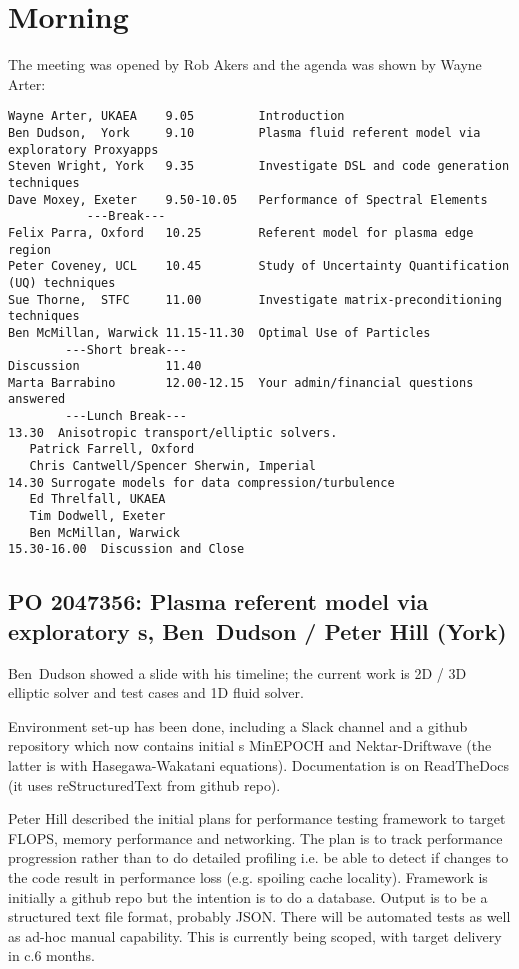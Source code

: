 \section{Morning}

The meeting was opened by Rob Akers and the agenda was shown by Wayne Arter:

\begin{verbatim}
Wayne Arter, UKAEA    9.05         Introduction
Ben Dudson,  York     9.10         Plasma fluid referent model via exploratory Proxyapps
Steven Wright, York   9.35         Investigate DSL and code generation techniques
Dave Moxey, Exeter    9.50-10.05   Performance of Spectral Elements
           ---Break---
Felix Parra, Oxford   10.25        Referent model for plasma edge region
Peter Coveney, UCL    10.45        Study of Uncertainty Quantification (UQ) techniques
Sue Thorne,  STFC     11.00        Investigate matrix-preconditioning techniques
Ben McMillan, Warwick 11.15-11.30  Optimal Use of Particles
        ---Short break---
Discussion            11.40
Marta Barrabino       12.00-12.15  Your admin/financial questions answered
        ---Lunch Break---
13.30  Anisotropic transport/elliptic solvers. 
   Patrick Farrell, Oxford
   Chris Cantwell/Spencer Sherwin, Imperial
14.30 Surrogate models for data compression/turbulence 
   Ed Threlfall, UKAEA
   Tim Dodwell, Exeter
   Ben McMillan, Warwick 
15.30-16.00  Discussion and Close
\end{verbatim}

\subsection{PO 2047356: Plasma referent model via exploratory \papp s, Ben~Dudson / Peter Hill (York)}

Ben~Dudson showed a slide with his timeline; the current work is 2D / 3D 
elliptic solver and test cases and 1D fluid solver.

Environment set-up has been done, including a Slack channel and a github 
repository which now contains initial \papp s MinEPOCH and Nektar-Driftwave 
(the latter is  with Hasegawa-Wakatani equations).  Documentation 
is on ReadTheDocs (it uses reStructuredText from github repo).

Peter Hill described the initial plans for performance testing framework to 
target FLOPS, memory performance and networking.  The plan is to track 
performance progression rather than to do detailed profiling i.e. be able to 
detect if changes to the code result in performance loss (e.g. spoiling cache 
locality).  Framework is initially a github repo but the intention is to do a 
database.  Output is to be a structured text file format, probably JSON.  There will be 
automated tests as well as ad-hoc manual capability.  This is currently being 
scoped, with target delivery in c.6 months.


